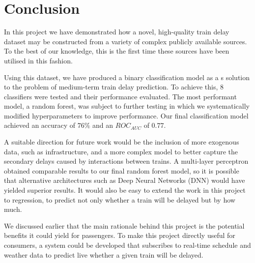 \documentclass[12pt,a4paper]{article}
\begin{document}
\clearpage
\section{Conclusion}

In this project we have demonstrated how a novel, high-quality train delay dataset may be constructed from a variety of complex publicly available sources. To the best of our knowledge, this is the first time these sources have been utilised in this fashion.  

Using this dataset, we have produced a binary classification model as a s solution to the problem of medium-term train delay prediction. To achieve this, $8$ classifiers were tested and their performance evaluated. The most performant model, a random forest, was subject to further testing in which we systematically modified hyperparameters to improve performance. Our final classification model achieved an accuracy of $76\%$ and an $ROC_{AUC}$ of $0.77$. 

A suitable direction for future work would be the inclusion of more exogenous data, such as infrastructure, and a more complex model to better capture the secondary delays caused by interactions between trains. A multi-layer perceptron obtained comparable results to our final random forest model, so it is possible that alternative architectures such as Deep Neural Networks (DNN) would have yielded superior results. It would also be easy to extend the work in this project to regression, to predict not only whether a train will be delayed but by how much.

We discussed earlier that the main rationale behind this project is the potential benefits it could yield for passengers. To make this project directly useful for consumers, a system could be developed that subscribes to real-time schedule and weather data to predict live whether a given train will be delayed.

\clearpage

\end{document}
